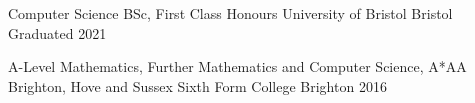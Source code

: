 \vspace{-0.1cm}

\begin{cventries}


    

\cvschool
    {Computer Science BSc, First Class Honours} %
    {University of Bristol} %
    {Bristol} %
    {Graduated 2021} %
    

\cvschool
    {A-Level Mathematics, Further Mathematics and Computer Science, A*AA} %
    {Brighton, Hove and Sussex Sixth Form College} %
    {Brighton} %
    {2016} %




\end{cventries}
